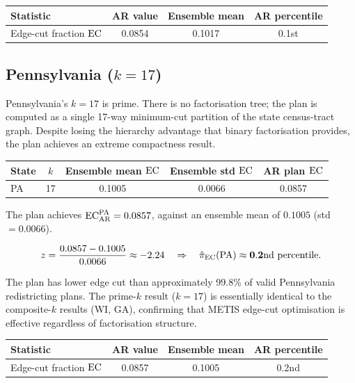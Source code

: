 \begin{center}
\begin{tabular}{lccc}
\toprule
Statistic & AR value & Ensemble mean & AR percentile \\
\midrule
Edge-cut fraction $\mathrm{EC}$ & 0.0854 & 0.1017 & 0.1st \\
\bottomrule
\end{tabular}
\end{center}

\subsection{Pennsylvania ($k = 17$)}

Pennsylvania's $k = 17$ is prime.  There is no factorisation tree; the plan
is computed as a single 17-way minimum-cut partition of the state census-tract
graph.  Despite losing the hierarchy advantage that binary factorisation
provides, the \ar{} plan achieves an extreme compactness result.

\begin{center}
\begin{tabular}{lcccc}
\toprule
State & $k$ & Ensemble mean $\mathrm{EC}$ & Ensemble std $\mathrm{EC}$ & AR plan $\mathrm{EC}$ \\
\midrule
PA & 17 & 0.1005 & 0.0066 & 0.0857 \\
\bottomrule
\end{tabular}
\end{center}

The \ar{} plan achieves $\mathrm{EC}_{\mathrm{AR}}^{\mathrm{PA}} = 0.0857$, against
an ensemble mean of $0.1005$ (std $= 0.0066$).

\begin{equation}
  z = \frac{0.0857 - 0.1005}{0.0066} \approx -2.24 \quad\Rightarrow\quad
  \hat\pi_{\mathrm{EC}}(\mathrm{PA}) \approx \mathbf{0.2\text{nd percentile}}.
\end{equation}

The \ar{} plan has lower edge cut than approximately 99.8\% of valid
Pennsylvania redistricting plans.  The prime-$k$ result ($k=17$) is
essentially identical to the composite-$k$ results (WI, GA), confirming that
METIS edge-cut optimisation is effective regardless of factorisation structure.

\begin{center}
\begin{tabular}{lccc}
\toprule
Statistic & AR value & Ensemble mean & AR percentile \\
\midrule
Edge-cut fraction $\mathrm{EC}$ & 0.0857 & 0.1005 & 0.2nd \\
\bottomrule
\end{tabular}
\end{center}

